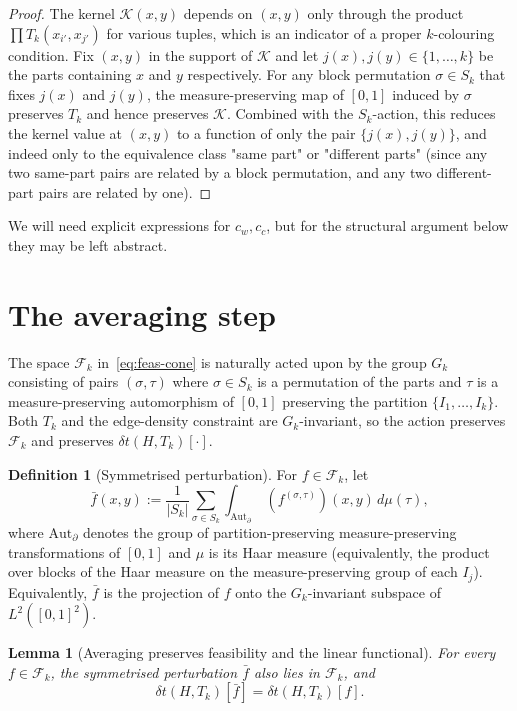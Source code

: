\documentclass[11pt]{amsart}
\newtheorem{lemma}[theorem]{Lemma}
\theoremstyle{definition}
\newtheorem{definition}[theorem]{Definition}
\newcommand{\1}{\mathbf 1}
\newcommand{\dd}{\,d}
\begin{document}
\begin{proof}
The kernel $\mathcal K(x,y)$ depends on $(x,y)$ only through the product
$\prod T_k(x_{i'}, x_{j'})$ for various tuples, which is an indicator of a
proper $k$-colouring condition.  Fix $(x,y)$ in the support of $\mathcal K$ and
let $j(x), j(y)\in\{1,\ldots,k\}$ be the parts containing $x$ and $y$
respectively.  For any block permutation $\sigma\in S_k$ that fixes
$j(x)$ and $j(y)$, the measure-preserving map of $[0,1]$ induced by $\sigma$
preserves $T_k$ and hence preserves $\mathcal K$.  Combined with the $S_k$-action,
this reduces the kernel value at $(x,y)$ to a function of only the pair
$\{j(x), j(y)\}$, and indeed only to the equivalence class
"same part" or "different parts" (since any two same-part pairs are related by
a block permutation, and any two different-part pairs are related by one).
\end{proof}

We will need explicit expressions for $c_w, c_c$, but for the structural
argument below they may be left abstract.

\section{The averaging step}

The space $\mathcal F_k$ in~\eqref{eq:feas-cone} is naturally acted upon by the
group $G_k$ consisting of pairs $(\sigma, \tau)$ where $\sigma\in S_k$ is a
permutation of the parts and $\tau$ is a measure-preserving automorphism of
$[0,1]$ preserving the partition $\{I_1,\ldots,I_k\}$.  Both $T_k$ and the
edge-density constraint are $G_k$-invariant, so the action preserves $\mathcal F_k$
and preserves $\delta t(H,T_k)[\cdot]$.

\begin{definition}[Symmetrised perturbation]
For $f\in\mathcal F_k$, let
\[
   \bar f(x,y) := \frac{1}{|S_k|}\sum_{\sigma\in S_k}
   \int_{\mathrm{Aut}_\partial}\ (f^{(\sigma,\tau)})(x,y)\dd\mu(\tau),
\]
where $\mathrm{Aut}_\partial$ denotes the group of partition-preserving
measure-preserving transformations of $[0,1]$ and $\mu$ is its Haar measure
(equivalently, the product over blocks of the Haar measure on the
measure-preserving group of each $I_j$).  Equivalently, $\bar f$ is the
projection of $f$ onto the $G_k$-invariant subspace of $L^2([0,1]^2)$.
\end{definition}

\begin{lemma}[Averaging preserves feasibility and the linear functional]
\label{lem:averaging}
For every $f\in\mathcal F_k$, the symmetrised perturbation $\bar f$ also lies in
$\mathcal F_k$, and
\[
   \delta t(H, T_k)[\bar f] = \delta t(H, T_k)[f].
\]
\end{lemma}
\end{document}
